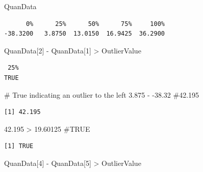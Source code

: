 \documentclass[
  letterpaper,
  DIV=11,
  numbers=noendperiod]{scrreprt}
\newenvironment{Shaded}{\begin{snugshade}}{\end{snugshade}}
\newcommand{\CommentTok}[1]{\textcolor[rgb]{0.37,0.37,0.37}{#1}}
\newcommand{\DecValTok}[1]{\textcolor[rgb]{0.68,0.00,0.00}{#1}}
\newcommand{\FloatTok}[1]{\textcolor[rgb]{0.68,0.00,0.00}{#1}}
\newcommand{\NormalTok}[1]{\textcolor[rgb]{0.00,0.23,0.31}{#1}}
\newcommand{\SpecialCharTok}[1]{\textcolor[rgb]{0.37,0.37,0.37}{#1}}
\begin{document}
\begin{Shaded}
\begin{Highlighting}[]
\NormalTok{QuanData}
\end{Highlighting}
\end{Shaded}

\begin{verbatim}
      0%      25%      50%      75%     100% 
-38.3200   3.8750  13.0150  16.9425  36.2900 
\end{verbatim}

\begin{Shaded}
\begin{Highlighting}[]
\NormalTok{QuanData[}\DecValTok{2}\NormalTok{] }\SpecialCharTok{{-}}\NormalTok{ QuanData[}\DecValTok{1}\NormalTok{] }\SpecialCharTok{\textgreater{}}\NormalTok{ OutlierValue}
\end{Highlighting}
\end{Shaded}

\begin{verbatim}
 25% 
TRUE 
\end{verbatim}

\begin{Shaded}
\begin{Highlighting}[]
\CommentTok{\# True indicating an outlier to the left}
\FloatTok{3.875} \SpecialCharTok{{-}} \SpecialCharTok{{-}}\FloatTok{38.32}  \CommentTok{\#42.195}
\end{Highlighting}
\end{Shaded}

\begin{verbatim}
[1] 42.195
\end{verbatim}

\begin{Shaded}
\begin{Highlighting}[]
\FloatTok{42.195} \SpecialCharTok{\textgreater{}} \FloatTok{19.60125}  \CommentTok{\#TRUE}
\end{Highlighting}
\end{Shaded}

\begin{verbatim}
[1] TRUE
\end{verbatim}

\begin{Shaded}
\begin{Highlighting}[]
\NormalTok{QuanData[}\DecValTok{4}\NormalTok{] }\SpecialCharTok{{-}}\NormalTok{ QuanData[}\DecValTok{5}\NormalTok{] }\SpecialCharTok{\textgreater{}}\NormalTok{ OutlierValue}
\end{Highlighting}
\end{Shaded}
\end{document}
